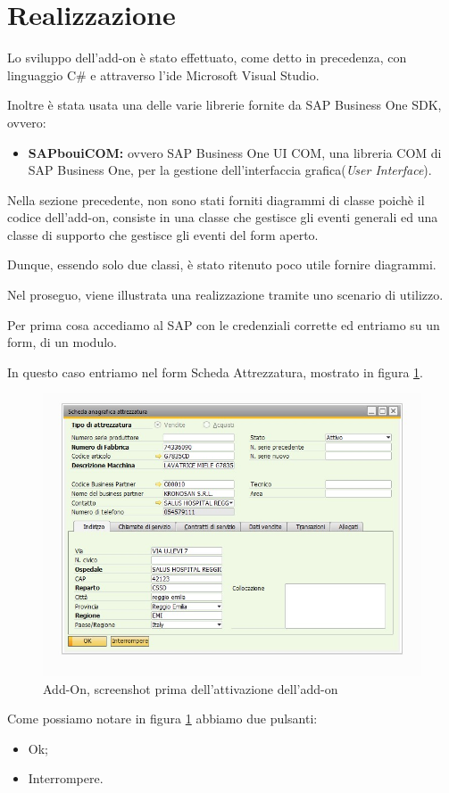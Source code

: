 \newpage

\section{Realizzazione}
\begin{flushleft}
	Lo sviluppo dell'add-on è stato effettuato, come detto in precedenza, con linguaggio C\# e attraverso l'\gls{ide} Microsoft Visual Studio.
	
	Inoltre è stata usata una delle varie librerie fornite da SAP Business One SDK, ovvero:
	\begin{itemize}
		\item \textbf{SAPbouiCOM:} ovvero SAP Business One UI COM, una libreria COM di SAP Business One, per la gestione dell'interfaccia grafica(\emph{User Interface}).
	\end{itemize}
	Nella sezione precedente, non sono stati forniti diagrammi di classe poichè il codice dell'add-on, consiste in una classe che gestisce gli eventi generali ed una classe di supporto che gestisce gli eventi del form aperto.
	
	Dunque, essendo solo due classi, è stato ritenuto poco utile fornire diagrammi.
	
	\vspace{1em}
	Nel proseguo, viene illustrata una realizzazione tramite uno scenario di utilizzo.
\end{flushleft}
\begin{flushleft}
	Per prima cosa accediamo al SAP con le credenziali corrette ed entriamo su un form, di un modulo.
	
	In questo caso entriamo nel form Scheda Attrezzatura, mostrato in figura \ref{fig:4-4}.
	
\end{flushleft}
\begin{figure}[!h] 
	\centering 
	\includegraphics[scale = 0.6]{immagini/add-on/addon-scheda-nobutton.jpg} 
	\caption{Add-On, screenshot prima dell'attivazione dell'add-on}
	\label{fig:4-4}
\end{figure}
Come possiamo notare in figura \ref{fig:4-4} abbiamo due pulsanti:
\begin{itemize}
	\item Ok;
	\item Interrompere.
\end{itemize}

